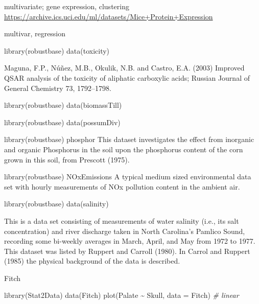 \documentclass[
]{book}
\newenvironment{Shaded}{\begin{snugshade}}{\end{snugshade}}
\newcommand{\AttributeTok}[1]{\textcolor[rgb]{0.77,0.63,0.00}{#1}}
\newcommand{\CommentTok}[1]{\textcolor[rgb]{0.56,0.35,0.01}{\textit{#1}}}
\newcommand{\FunctionTok}[1]{\textcolor[rgb]{0.00,0.00,0.00}{#1}}
\newcommand{\NormalTok}[1]{#1}
\newcommand{\SpecialCharTok}[1]{\textcolor[rgb]{0.00,0.00,0.00}{#1}}
\begin{document}
multivariate; gene expression, clustering
\url{https://archive.ics.uci.edu/ml/datasets/Mice+Protein+Expression}

multivar, regression

\begin{Shaded}
\begin{Highlighting}[]
\FunctionTok{library}\NormalTok{(robustbase)}
\FunctionTok{data}\NormalTok{(toxicity)}
\end{Highlighting}
\end{Shaded}

Maguna, F.P., Núñez, M.B., Okulik, N.B. and Castro, E.A. (2003) Improved QSAR analysis of the toxicity of aliphatic carboxylic acids; Russian Journal of General Chemistry 73, 1792--1798.

library(robustbase)
data(biomassTill)

library(robustbase)
data(possumDiv)

library(robustbase)
phosphor
This dataset investigates the effect from inorganic and organic Phosphorus in the soil upon the phosphorus content of the corn grown in this soil, from Prescott (1975).

library(robustbase)
NOxEmissions
A typical medium sized environmental data set with hourly measurements of NOx pollution content in the ambient air.

\begin{Shaded}
\begin{Highlighting}[]
\FunctionTok{library}\NormalTok{(robustbase)}
\FunctionTok{data}\NormalTok{(salinity)}
\end{Highlighting}
\end{Shaded}

This is a data set consisting of measurements of water salinity (i.e., its salt concentration) and river discharge taken in North Carolina's Pamlico Sound, recording some bi-weekly averages in March, April, and May from 1972 to 1977. This dataset was listed by Ruppert and Carroll (1980). In Carrol and Ruppert (1985) the physical background of the data is described.

Fitch

\begin{Shaded}
\begin{Highlighting}[]
\FunctionTok{library}\NormalTok{(Stat2Data)}
\FunctionTok{data}\NormalTok{(Fitch)}
\FunctionTok{plot}\NormalTok{(Palate }\SpecialCharTok{\textasciitilde{}}\NormalTok{ Skull, }\AttributeTok{data =}\NormalTok{ Fitch) }\CommentTok{\# linear}
\end{Highlighting}
\end{Shaded}
\end{document}

